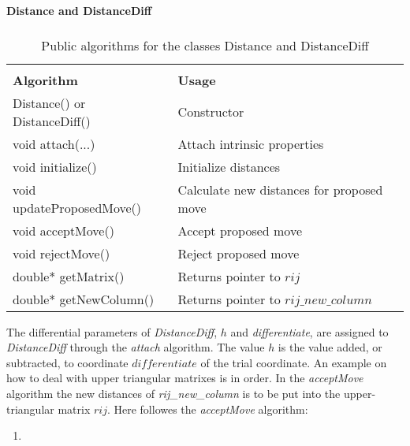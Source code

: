 \begin{table}[hbtp]
\begin{center} {\large \bf Distance and DistanceDiff} \\ 
$\phantom{a}$ \\
\begin{tabular}{ll}
\hline\\ 
{\bf Algorithm}              & {\bf Usage} \\
Distance() or DistanceDiff() &Constructor\\
void attach(...)             &Attach intrinsic properties\\
void initialize()            &Initialize distances\\
void updateProposedMove()    &Calculate new distances for proposed move\\
void acceptMove()            &Accept proposed move\\
void rejectMove()            &Reject proposed move\\
double* getMatrix()          &Returns pointer to $rij$\\
double* getNewColumn()       &Returns pointer to $rij\_new\_column$\\
\hline
\end{tabular} 
\end{center}
\caption{Public algorithms for the classes Distance and DistanceDiff}
\label{Distance}
\end{table}

The differential parameters of
\emph{DistanceDiff}, $h$ and \emph{differentiate}, are assigned to
\emph{DistanceDiff} through the \emph{attach} algorithm. The value $h$
is the value added, or subtracted, to coordinate $differentiate$ of the
trial coordinate. \newline
An example on how to deal with upper triangular matrixes 
is in order. In the \emph{acceptMove} algorithm the new distances of
\emph{rij\_new\_column} is to be put into the upper-triangular matrix
$rij$. Here followes the \emph{acceptMove} algorithm:

{\footnotesize
\begin{enumerate}
\item[]

\end{enumerate}
}


